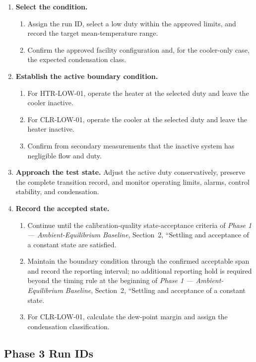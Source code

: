 \documentclass[11pt]{article}
\newcommand{\PhaseOneDoc}{\textit{Phase 1 --- Ambient-Equilibrium Baseline}}
\begin{document}
\begin{enumerate}
    \item \textbf{Select the condition.}
    \begin{enumerate}
        \item Assign the run ID, select a low duty within the approved limits, and record the target mean-temperature range.
        \item Confirm the approved facility configuration and, for the cooler-only case, the expected condensation class.
    \end{enumerate}

    \item \textbf{Establish the active boundary condition.}
    \begin{enumerate}
        \item For HTR-LOW-01, operate the heater at the selected duty and leave the cooler inactive.
        \item For CLR-LOW-01, operate the cooler at the selected duty and leave the heater inactive.
        \item Confirm from secondary measurements that the inactive system has negligible flow and duty.
    \end{enumerate}

    \item \textbf{Approach the test state.}
    Adjust the active duty conservatively, preserve the complete transition record, and monitor operating limits, alarms, control stability, and condensation.

    \item \textbf{Record the accepted state.}
    \begin{enumerate}
        \item Continue until the calibration-quality state-acceptance criteria of \PhaseOneDoc, Section~2, ``Settling and acceptance of a constant state are satisfied.
        \item Maintain the boundary condition through the confirmed acceptable span and record the reporting interval; no additional reporting hold is required beyond the timing rule at the beginning of \PhaseOneDoc, Section~2, ``Settling and acceptance of a constant state.
        \item For CLR-LOW-01, calculate the dew-point margin and assign the condensation classification.
    \end{enumerate}
\end{enumerate}

\subsection{Phase 3 Run IDs}
\end{document}
